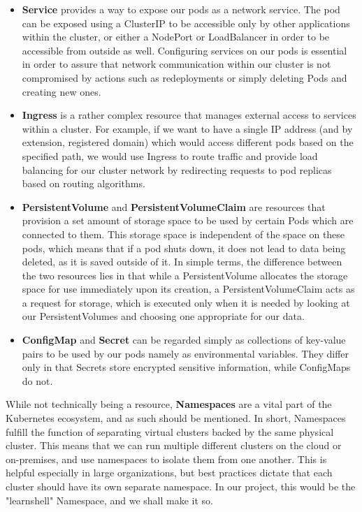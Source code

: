 \documentclass[thesis=B,english]{FITthesis}[2019/12/23]
\begin{document}
\begin{itemize}
  \setlength\itemsep{0em}
  \item \textbf{Service} provides a way to expose our pods as a network service. The pod can be exposed using a ClusterIP to be accessible only by other applications within the cluster, or either a NodePort or LoadBalancer in order to be accessible from outside as well. Configuring services on our pods is essential in order to assure that network communication within our cluster is not compromised by actions such as redeployments or simply deleting Pods and creating new ones.
  \item \textbf{Ingress} is a rather complex resource that manages external access to services within a cluster. For example, if we want to have a single IP address (and by extension, registered domain) which would access different pods based on the specified path, we would use Ingress to route traffic and provide load balancing for our cluster network by redirecting requests to pod replicas based on routing algorithms.
  \item \textbf{PersistentVolume} and \textbf{PersistentVolumeClaim} are resources that provision a set amount of storage space to be used by certain Pods which are connected to them. This storage space is independent of the space on these pods, which means that if a pod shuts down, it does not lead to data being deleted, as it is saved outside of it. In simple terms, the difference between the two resources lies in that while a PersistentVolume allocates the storage space for use immediately upon its creation, a PersistentVolumeClaim acts as a request for storage, which is executed only when it is needed by looking at our PersistentVolumes and choosing one appropriate for our data. 
  \item \textbf{ConfigMap} and \textbf{Secret} can be regarded simply as collections of key-value pairs to be used by our pods namely as environmental variables. They differ only in that Secrets store encrypted sensitive information, while ConfigMaps do not.
\end{itemize}

While not technically being a resource, \textbf{Namespaces} are a vital part of the Kubernetes ecosystem, and as such should be mentioned. In short, Namespaces fulfill the function of separating virtual clusters backed by the same physical cluster. This means that we can run multiple different clusters on the cloud or on-premises, and use namespaces to isolate them from one another. This is helpful especially in large organizations, but best practices dictate that each cluster should have its own separate namespace. In our project, this would be the "learnshell" Namespace, and we shall make it so.
\end{document}
